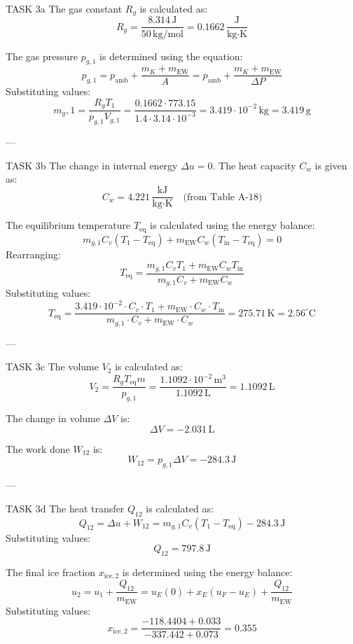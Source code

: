 TASK 3a  
The gas constant \( R_g \) is calculated as:  
\[
R_g = \frac{8.314 \, \text{J}}{50 \, \text{kg/mol}} = 0.1662 \, \frac{\text{J}}{\text{kg·K}}
\]  

The gas pressure \( p_{g,1} \) is determined using the equation:  
\[
p_{g,1} = p_{\text{amb}} + \frac{m_K + m_{\text{EW}}}{A} = p_{\text{amb}} + \frac{m_K + m_{\text{EW}}}{\Delta P}
\]  
Substituting values:  
\[
m_g,1 = \frac{R_g T_1}{p_{g,1} V_{g,1}} = \frac{0.1662 \cdot 773.15}{1.4 \cdot 3.14 \cdot 10^{-3}} = 3.419 \cdot 10^{-2} \, \text{kg} = 3.419 \, \text{g}
\]  

---

TASK 3b  
The change in internal energy \( \Delta u = 0 \). The heat capacity \( C_w \) is given as:  
\[
C_w = 4.221 \, \frac{\text{kJ}}{\text{kg·K}} \quad \text{(from Table A-18)}
\]  

The equilibrium temperature \( T_{\text{eq}} \) is calculated using the energy balance:  
\[
m_{g,1} C_v (T_1 - T_{\text{eq}}) + m_{\text{EW}} C_w (T_{\text{in}} - T_{\text{eq}}) = 0
\]  
Rearranging:  
\[
T_{\text{eq}} = \frac{m_{g,1} C_v T_1 + m_{\text{EW}} C_w T_{\text{in}}}{m_{g,1} C_v + m_{\text{EW}} C_w}
\]  
Substituting values:  
\[
T_{\text{eq}} = \frac{3.419 \cdot 10^{-2} \cdot C_v \cdot T_1 + m_{\text{EW}} \cdot C_w \cdot T_{\text{in}}}{m_{g,1} \cdot C_v + m_{\text{EW}} \cdot C_w} = 275.71 \, \text{K} = 2.56^\circ \text{C}
\]  

---

TASK 3c  
The volume \( V_2 \) is calculated as:  
\[
V_2 = \frac{R_g T_{\text{eq}} m}{p_{g,1}} = \frac{1.1092 \cdot 10^{-2} \, \text{m}^3}{1.1092 \, \text{L}} = 1.1092 \, \text{L}
\]  

The change in volume \( \Delta V \) is:  
\[
\Delta V = -2.031 \, \text{L}
\]  

The work done \( W_{12} \) is:  
\[
W_{12} = p_{g,1} \Delta V = -284.3 \, \text{J}
\]  

---

TASK 3d  
The heat transfer \( Q_{12} \) is calculated as:  
\[
Q_{12} = \Delta u + W_{12} = m_{g,1} C_v (T_1 - T_{\text{eq}}) - 284.3 \, \text{J}
\]  
Substituting values:  
\[
Q_{12} = 797.8 \, \text{J}
\]  

The final ice fraction \( x_{\text{ice},2} \) is determined using the energy balance:  
\[
u_2 = u_1 + \frac{Q_{12}}{m_{\text{EW}}} = u_E(0) + x_E (u_{F} - u_E) + \frac{Q_{12}}{m_{\text{EW}}}
\]  
Substituting values:  
\[
x_{\text{ice},2} = \frac{-118.4404 + 0.033}{-337.442 + 0.073} = 0.355
\]  